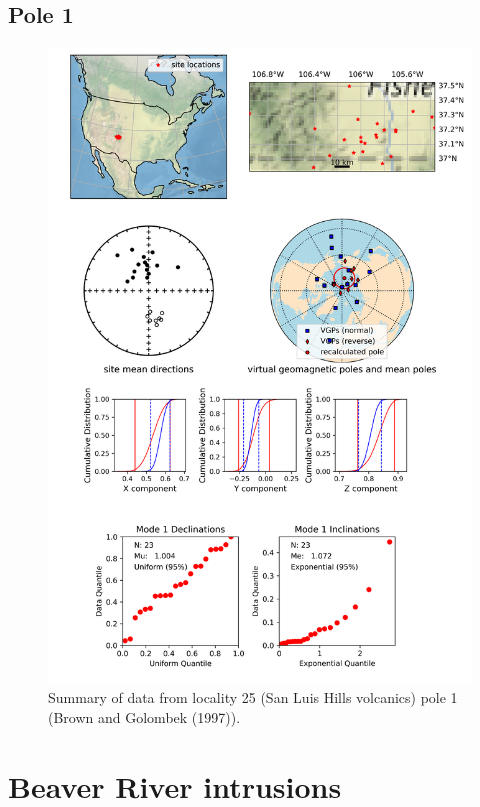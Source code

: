 \subsection{Pole 1}


\begin{figure}[H]
\centering
\includegraphics[width=5 in]{./25/1/pole_summary.png}
\caption{Summary of data from locality 25 (San Luis Hills volcanics) pole 1 (Brown and Golombek (1997)).}
\end{figure}

\section{Beaver River intrusions}
